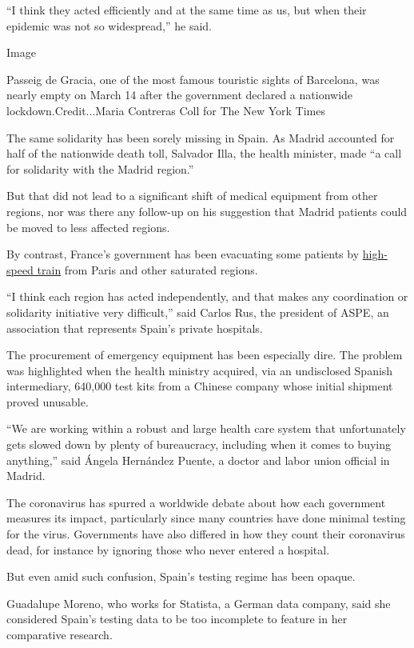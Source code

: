 ``I think they acted efficiently and at the same time as us, but when
their epidemic was not so widespread,'' he said.

Image

Passeig de Gracia, one of the most famous touristic sights of Barcelona,
was nearly empty on March 14 after the government declared a nationwide
lockdown.Credit...Maria Contreras Coll for The New York Times

The same solidarity has been sorely missing in Spain. As Madrid
accounted for half of the nationwide death toll, Salvador Illa, the
health minister, made ``a call for solidarity with the Madrid region.''

But that did not lead to a significant shift of medical equipment from
other regions, nor was there any follow-up on his suggestion that Madrid
patients could be moved to less affected regions.

By contrast, France's government has been evacuating some patients by
\href{https://www.france24.com/en/20200326-france-stages-first-train-evacuation-of-coronavirus-patients}{high-speed
train} from Paris and other saturated regions.

``I think each region has acted independently, and that makes any
coordination or solidarity initiative very difficult,'' said Carlos Rus,
the president of ASPE, an association that represents Spain's private
hospitals.

The procurement of emergency equipment has been especially dire. The
problem was highlighted when the health ministry acquired, via an
undisclosed Spanish intermediary, 640,000 test kits from a Chinese
company whose initial shipment proved unusable.

``We are working within a robust and large health care system that
unfortunately gets slowed down by plenty of bureaucracy, including when
it comes to buying anything,'' said Ángela Hernández Puente, a doctor
and labor union official in Madrid.

The coronavirus has spurred a worldwide debate about how each government
measures its impact, particularly since many countries have done minimal
testing for the virus. Governments have also differed in how they count
their coronavirus dead, for instance by ignoring those who never entered
a hospital.

But even amid such confusion, Spain's testing regime has been opaque.

Guadalupe Moreno, who works for Statista, a German data company, said
she considered Spain's testing data to be too incomplete to feature in
her comparative research.

